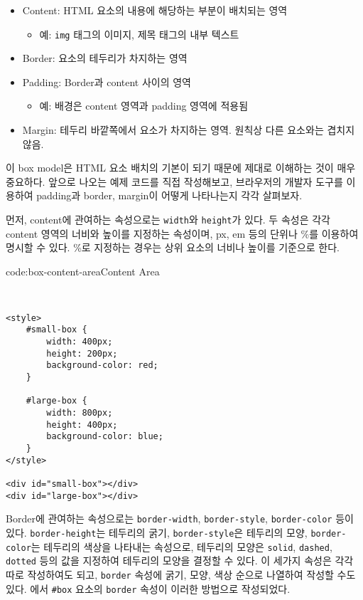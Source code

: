 \begin{itemize}
    \item Content: HTML 요소의 내용에 해당하는 부분이 배치되는 영역
    \begin{itemize}
        \item 예: \texttt{img} 태그의 이미지, 제목 태그의 내부 텍스트
    \end{itemize}
    \item Border: 요소의 테두리가 차지하는 영역
    \item Padding: Border과 content 사이의 영역
    \begin{itemize}
        \item 예: 배경은 content 영역과 padding 영역에 적용됨
    \end{itemize}
    \item Margin: 테두리 바깥쪽에서 요소가 차지하는 영역. 원칙상 다른 요소와는 겹치지 않음.
\end{itemize}


이 box model은 HTML 요소 배치의 기본이 되기 때문에 제대로 이해하는 것이 매우 중요하다. 앞으로 나오는 예제 코드를 직접 작성해보고, 브라우저의 개발자 도구를 이용하여 padding과 border, margin이 어떻게 나타나는지 각각 살펴보자.

먼저, content에 관여하는 속성으로는 \texttt{width}와 \texttt{height}가 있다. 두 속성은 각각 content 영역의 너비와 높이를 지정하는 속성이며, px, em 등의 단위나 \%를 이용하여 명시할 수 있다. \%로 지정하는 경우는 상위 요소의 너비나 높이를 기준으로 한다.
\pagebreak

\begin{codeenv}{code:box-content-area}{Content Area}\begin{verbatim}


<style>
    #small-box {
        width: 400px;
        height: 200px;
        background-color: red;
    }

    #large-box {
        width: 800px;
        height: 400px;
        background-color: blue;
    }
</style>

<div id="small-box"></div>
<div id="large-box"></div>
\end{verbatim}
\end{codeenv}

Border에 관여하는 속성으로는 \texttt{border-width}, \texttt{border-style}, \texttt{border-color} 등이 있다. \texttt{border-height}는 테두리의 굵기, \texttt{border-style}은 테두리의 모양, \texttt{border-color}는 테두리의 색상을 나타내는 속성으로, 테두리의 모양은 \texttt{solid}, \texttt{dashed}, \texttt{dotted} 등의 값을 지정하여 테두리의 모양을 결정할 수 있다. 이 세가지 속성은 각각 따로 작성하여도 되고, \texttt{border} 속성에 굵기, 모양, 색상 순으로 나열하여 작성할 수도 있다. 에서 \texttt{\#box} 요소의 \texttt{border} 속성이 이러한 방법으로 작성되었다. 

